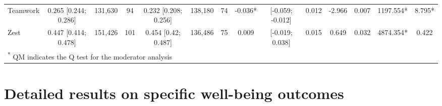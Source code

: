 \documentclass[
  man,floatsintext]{apa6}
\begin{document}
\begin{table}
{\begin{tabular}[t]{lccccccccccccc}
Teamwork & 0.265 [0.244; 0.286] & 131,630 & 94 & 0.232 [0.208; 0.256] & 138,180 & 74 & -0.036* & {}[-0.059; -0.012] & 0.012 & -2.966 & 0.007 & 1197.554* & 8.795*\\
Zest & 0.447 [0.414; 0.478] & 151,426 & 101 & 0.454 [0.42; 0.487] & 136,486 & 75 & 0.009 & {}[-0.019;  0.038] & 0.015 & 0.649 & 0.032 & 4874.354* & 0.422\\
\bottomrule
\multicolumn{14}{l}{\textsuperscript{*} QM indicates the Q test for the moderator analysis}\\
\end{tabular}}
\end{table}

\newpage

\hypertarget{detailed-results-on-specific-well-being-outcomes}{%
\section{Detailed results on specific well-being outcomes}\label{detailed-results-on-specific-well-being-outcomes}}
\end{document}
